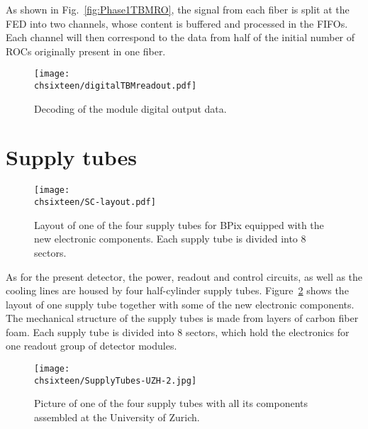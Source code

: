 As shown in Fig.~\ref{fig:Phase1TBMRO}, the signal from each fiber is split at the FED into two channels, whose content is buffered and processed in the FIFOs.
Each channel will then correspond to the data from half of the initial number of ROCs originally present in one fiber.

\clearpage

\begin{figure}[!htb]
 \begin{center}
 \texttt{[image: \\chsixteen/digitalTBMreadout.pdf]}
 \end{center}
 \caption{Decoding of the module digital output data.}
 \label{fig:digTBMRO}
\end{figure}

\section{Supply tubes}

\begin{figure}[!htb]
 \begin{center}
 \texttt{[image: \\chsixteen/SC-layout.pdf]}
 \end{center}
 \caption{Layout of one of the four supply tubes for BPix equipped with the new electronic components. Each supply tube is divided into 8 sectors.}
 \label{fig:phase1SC}
\end{figure}

As for the present detector, the power, readout and control circuits, as well as the cooling lines are housed by four half-cylinder supply tubes.
Figure~\ref{fig:phase1SC} shows the layout of one supply tube together with some of the new electronic components.
The mechanical structure of the supply tubes is made from layers of carbon fiber foam. Each supply tube is divided into 8 sectors, which hold the electronics for one readout group of detector modules.

\begin{wrapfigure}{R}{0.4\textwidth}
 \centering
 \texttt{[image: \\chsixteen/SupplyTubes-UZH-2.jpg]}
 \caption{Picture of one of the four supply tubes with all its components assembled at the University of Zurich.}
 \label{fig:SCuzh}
\end{wrapfigure}


